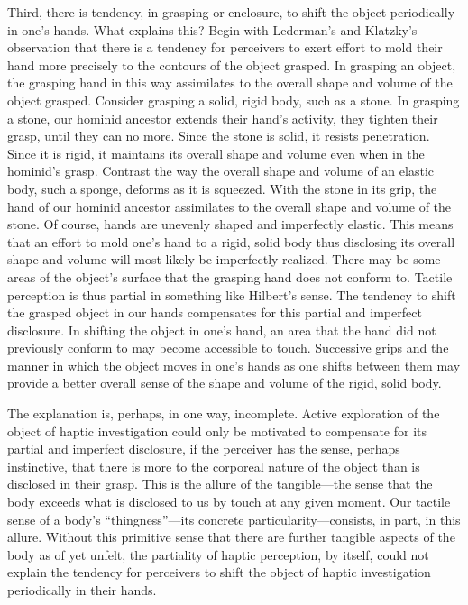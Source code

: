 Third, there is tendency, in grasping or enclosure, to shift the object periodically in one's hands. What explains this? Begin with Lederman's and Klatzky's \citeyearpar{Lederman:1987fr} observation that there is a tendency for perceivers to exert effort to mold their hand more precisely to the contours of the object grasped. In grasping an object, the grasping hand in this way assimilates to the overall shape and volume of the object grasped. Consider grasping a solid, rigid body, such as a stone. In grasping a stone, our hominid ancestor extends their hand's activity, they tighten their grasp, until they can no more. Since the stone is solid, it resists penetration. Since it is rigid, it maintains its overall shape and volume even when in the hominid's grasp. Contrast the way the overall shape and volume of an elastic body, such a sponge, deforms as it is squeezed. With the stone in its grip, the hand of our hominid ancestor assimilates to the overall shape and volume of the stone. Of course, hands are unevenly shaped and imperfectly elastic. This means that an effort to mold one's hand to a rigid, solid body thus disclosing its overall shape and volume will most likely be imperfectly realized. There may be some areas of the object's surface that the grasping hand does not conform to. Tactile perception is thus partial in something like Hilbert's \citeyearpar{Hilbert:1987jq} sense. The tendency to shift the grasped object in our hands compensates for this partial and imperfect disclosure. In shifting the object in one's hand, an area that the hand did not previously conform to may become accessible to touch. Successive grips and the manner in which the object moves in one's hands as one shifts between them may provide a better overall sense of the shape and volume of the rigid, solid body. 

The explanation is, perhaps, in one way, incomplete. Active exploration of the object of haptic investigation could only be motivated to compensate for its partial and imperfect disclosure, if the perceiver has the sense, perhaps instinctive, that there is more to the corporeal nature of the object than is disclosed in their grasp. This is the allure of the tangible---the sense that the body exceeds what is disclosed to us by touch at any given moment. Our tactile sense of a body's ``thingness''---its concrete particularity---consists, in part, in this allure. Without this primitive sense that there are further tangible aspects of the body as of yet unfelt, the partiality of haptic perception, by itself, could not explain the tendency for perceivers to shift the object of haptic investigation periodically in their hands.

